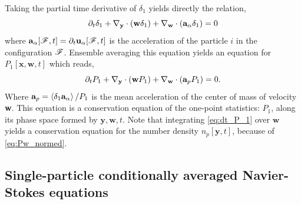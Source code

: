 Taking the partial time derivative of $\delta_1$ yields directly the relation, 
\begin{equation}
    \pddt\delta_1 
    + \pddy\cdot(\textbf{w}\delta_1)
    + \pddw\cdot(\textbf{a}_\alpha\delta_1)
    = 0 
    \label{eq:dt_delta_1}
\end{equation}
where $\textbf{a}_\alpha[\mathscr{F},t] = \partial_t \textbf{u}_\alpha[\mathscr{F},t]$ is the acceleration of the particle $i$ in the configuration $\mathscr{F}$. 
Ensemble averaging this equation yields an equation for  $P_1[\textbf{x},\textbf{w},t]$ which reads, 
\begin{equation}
    \pddt P_1
    + \pddy\cdot(\textbf{w}  P_1)
    + \pddw\cdot(\textbf{a}_p P_1)
    = 0.
    \label{eq:dt_P_1}
\end{equation}
Where $\textbf{a}_p = \left<\delta_1 \textbf{a}_\alpha\right>/P_1$ is the mean acceleration of the center of mass of velocity \textbf{w}. 
This equation is a conservation equation of the one-point statistics: $P_1$,  along its phase space formed by $\textbf{y},\textbf{w},t$. 
Note that integrating \ref{eq:dt_P_1} over $\textbf{w}$ yields a conservation equation for the number density $n_p[\textbf{y},t]$, because of \ref{eq:Pw_normed}.  

\subsection{Single-particle conditionally averaged  Navier-Stokes equations}



